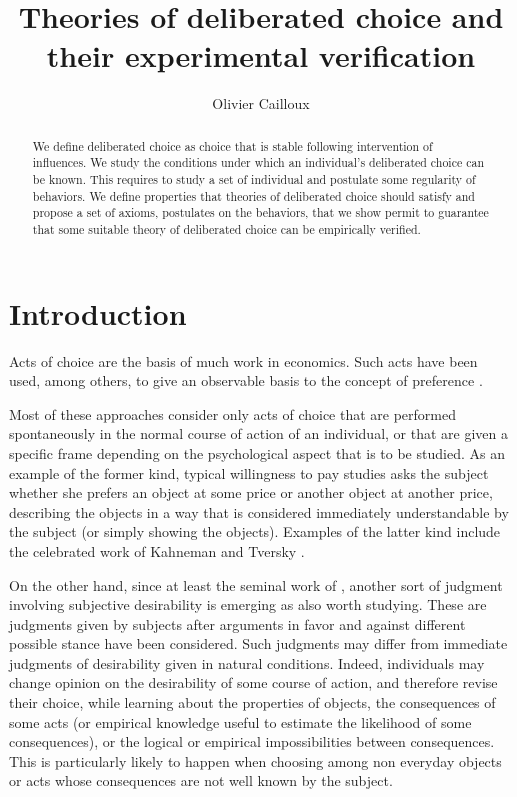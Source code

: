 \documentclass[version=last, pagesize, twoside=off, bibliography=totoc, fontsize=12pt, a4paper, french, english]{scrartcl}
\begin{document}
\title{Theories of deliberated choice and their experimental verification}
\author{Olivier Cailloux}
\makeatletter
{}
\makeatother
\maketitle

\begin{abstract}
  We define deliberated choice as choice that is stable following intervention of influences. 
  We study the conditions under which an individual’s deliberated choice can be known. 
  This requires to study a set of individual and postulate some regularity of behaviors. 
  We define properties that theories of deliberated choice should satisfy and propose a set of axioms, postulates on the behaviors, that we show permit to guarantee that some suitable theory of deliberated choice can be empirically verified.
\end{abstract}

\section{Introduction}
Acts of choice are the basis of much work in economics. Such acts have been used, among others, to give an observable basis to the concept of preference \citep{samuelson_foundations_1983}. 

Most of these approaches consider only acts of choice that are performed spontaneously in the normal course of action of an individual, or that are given a specific frame depending on the psychological aspect that is to be studied. As an example of the former kind, typical willingness to pay studies asks the subject whether she prefers an object at some price or another object at another price, describing the objects in a way that is considered immediately understandable by the subject (or simply showing the objects). Examples of the latter kind include the celebrated work of Kahneman and Tversky \citep{bell_descriptive_1988, kahneman_thinking_2012}.

On the other hand, since at least the seminal work of \citet{fishkin_when_2011}, another sort of judgment involving subjective desirability is emerging as also worth studying. These are judgments given by subjects after arguments in favor and against different possible stance have been considered. Such judgments may differ from immediate judgments of desirability given in natural conditions. Indeed, individuals may change opinion on the desirability of some course of action, and therefore revise their choice, while learning about the properties of objects, the consequences of some acts (or empirical knowledge useful to estimate the likelihood of some consequences), or the logical or empirical impossibilities between consequences. This is particularly likely to happen when choosing among non everyday objects or acts whose consequences are not well known by the subject.
\end{document}
